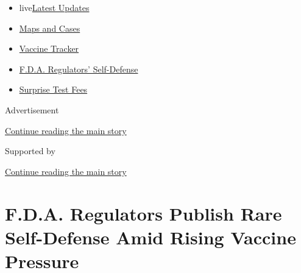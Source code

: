 \begin{itemize}
\tightlist
\item
  live\href{https://www.nytimes3xbfgragh.onion/2020/09/11/world/covid-19-coronavirus.html?name=styln-coronavirus-national\&region=TOP_BANNER\&block=storyline_menu_recirc\&action=click\&pgtype=Article\&impression_id=c5814b51-f4be-11ea-a306-edc47b8f412f\&variant=undefined}{Latest
  Updates}
\item
  \href{https://www.nytimes3xbfgragh.onion/interactive/2020/us/coronavirus-us-cases.html?name=styln-coronavirus-national\&region=TOP_BANNER\&block=storyline_menu_recirc\&action=click\&pgtype=Article\&impression_id=c5817260-f4be-11ea-a306-edc47b8f412f\&variant=undefined}{Maps
  and Cases}
\item
  \href{https://www.nytimes3xbfgragh.onion/interactive/2020/science/coronavirus-vaccine-tracker.html?name=styln-coronavirus-national\&region=TOP_BANNER\&block=storyline_menu_recirc\&action=click\&pgtype=Article\&impression_id=c5817261-f4be-11ea-a306-edc47b8f412f\&variant=undefined}{Vaccine
  Tracker}
\item
  \href{https://www.nytimes3xbfgragh.onion/2020/09/10/us/politics/fda-coronavirus-vaccine.html?name=styln-coronavirus-national\&region=TOP_BANNER\&block=storyline_menu_recirc\&action=click\&pgtype=Article\&impression_id=c5817262-f4be-11ea-a306-edc47b8f412f\&variant=undefined}{F.D.A.
  Regulators' Self-Defense}
\item
  \href{https://www.nytimes3xbfgragh.onion/2020/09/09/upshot/coronavirus-surprise-test-fees.html?name=styln-coronavirus-national\&region=TOP_BANNER\&block=storyline_menu_recirc\&action=click\&pgtype=Article\&impression_id=c5817263-f4be-11ea-a306-edc47b8f412f\&variant=undefined}{Surprise
  Test Fees}
\end{itemize}

Advertisement

\protect\hyperlink{after-top}{Continue reading the main story}

Supported by

\protect\hyperlink{after-sponsor}{Continue reading the main story}

\hypertarget{fda-regulators-publish-rare-self-defense-amid-rising-vaccine-pressure}{%
\section{F.D.A. Regulators Publish Rare Self-Defense Amid Rising Vaccine
Pressure}\label{fda-regulators-publish-rare-self-defense-amid-rising-vaccine-pressure}}

